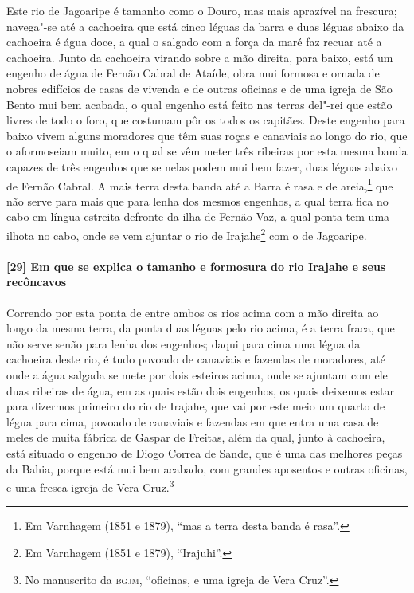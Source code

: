 Este rio de Jagoaripe é tamanho como o Douro, mas mais aprazível na frescura; navega"-se
até a cachoeira que está cinco léguas da barra e duas léguas abaixo da cachoeira é água
doce, a qual o salgado com a força da maré faz recuar até a cachoeira. Junto da cachoeira
virando sobre a mão direita, para baixo, está um engenho de água de Fernão Cabral de
Ataíde, obra mui formosa e ornada de nobres edifícios de casas de vivenda e de outras
oficinas e de uma igreja de São Bento mui bem acabada, o qual engenho está feito nas
terras del"-rei que estão livres de todo o foro, que costumam pôr os todos os capitães.
Deste engenho para baixo vivem alguns
moradores que têm suas roças e canaviais ao longo do rio, que o aformoseiam muito, em o
qual se vêm meter três ribeiras por esta mesma banda capazes de três engenhos que se nelas
podem mui bem fazer, duas léguas abaixo de Fernão Cabral. A mais terra desta banda até a
Barra é rasa e de areia,\footnote{ Em Varnhagem (1851 e 1879), ``mas a terra desta banda é
rasa''.} que não serve para mais que para lenha dos mesmos engenhos, a qual terra fica no
cabo em língua estreita defronte da ilha de Fernão Vaz, a qual ponta tem uma ilhota no
cabo, onde se vem ajuntar o rio de Irajahe\footnote{ Em Varnhagem (1851 e 1879),
``Irajuhi''.} com o de Jagoaripe.

\paragraph{[29] Em que se explica o tamanho e formosura do rio Irajahe e seus recôncavos}\quad
Correndo por esta ponta de entre ambos os rios acima com a mão direita ao longo da mesma
terra, da ponta duas léguas pelo rio acima, é a terra fraca, que não serve senão para
lenha dos engenhos; daqui para cima uma légua da cachoeira deste rio, é tudo povoado de
canaviais e fazendas de moradores, até onde a água salgada se mete por dois esteiros
acima, onde se ajuntam com ele duas ribeiras de água, em as quais estão dois engenhos, os
quais deixemos estar para dizermos primeiro do rio de Irajahe, que vai por este meio um
quarto de légua para cima, povoado de canaviais e fazendas em que entra uma casa de meles
de muita fábrica de Gaspar de Freitas, além da qual, junto à cachoeira, está situado o
engenho de Diogo Correa de Sande, que é uma das melhores peças da Bahia, porque está mui
bem acabado, com grandes aposentos e outras oficinas, e uma fresca igreja de Vera
Cruz.\footnote{ No manuscrito da \textsc{bgjm}, ``oficinas, e uma igreja de Vera Cruz''.}

